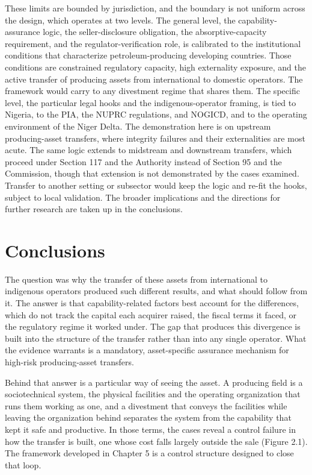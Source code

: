 \documentclass[twoside,fontset=lmodern]{mitthesis}
\begin{document}
These limits are bounded by jurisdiction, and the boundary is not
uniform across the design, which operates at two levels. The general
level, the capability-assurance logic, the seller-disclosure obligation,
the absorptive-capacity requirement, and the regulator-verification
role, is calibrated to the institutional conditions that characterize
petroleum-producing developing countries. Those conditions are
constrained regulatory capacity, high externality exposure, and the
active transfer of producing assets from international to domestic
operators. The framework would carry to any divestment regime that
shares them. The specific level, the particular legal hooks and the
indigenous-operator framing, is tied to Nigeria, to the PIA, the NUPRC
regulations, and NOGICD, and to the operating environment of the Niger
Delta. The demonstration here is on upstream producing-asset transfers,
where integrity failures and their externalities are most acute. The
same logic extends to midstream and downstream transfers, which proceed
under Section 117 and the Authority instead of Section 95 and the
Commission, though that extension is not demonstrated by the cases
examined. Transfer to another setting or subsector would keep the logic
and re-fit the hooks, subject to local validation. The broader
implications and the directions for further research are taken up in the
conclusions.


\hypertarget{conclusions}{%
\chapter{Conclusions}\label{conclusions}}

The question was why the transfer of these assets from international to
indigenous operators produced such different results, and what should
follow from it. The answer is that capability-related factors best
account for the differences, which do not track the capital each
acquirer raised, the fiscal terms it faced, or the regulatory regime it
worked under. The gap that produces this divergence is built into the
structure of the transfer rather than into any single operator. What the
evidence warrants is a mandatory, asset-specific assurance mechanism for
high-risk producing-asset transfers.

Behind that answer is a particular way of seeing the asset. A producing
field is a sociotechnical system, the physical facilities and the
operating organization that runs them working as one, and a divestment
that conveys the facilities while leaving the organization behind
separates the system from the capability that kept it safe and
productive. In those terms, the cases reveal a control failure in how
the transfer is built, one whose cost falls largely outside the sale
(Figure 2.1). The framework developed in Chapter 5 is a control
structure designed to close that loop.
\end{document}

